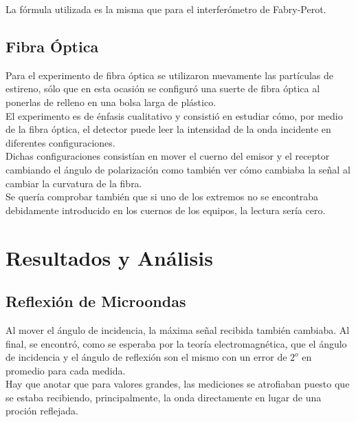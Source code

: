 \documentclass[%
 reprint,
 amsmath,amssymb,
 aps,
]{revtex4-1}
\begin{document}
La fórmula utilizada es la misma que para el interferómetro de Fabry-Perot. \\


\subsection{\label{sec:level2}Fibra Óptica}

Para el experimento de fibra óptica se utilizaron nuevamente las partículas de estireno, sólo que en esta ocasión se configuró una suerte de fibra óptica al ponerlas de relleno en una bolsa larga de plástico. \\

El experimento es de énfasis cualitativo y consistió en estudiar cómo, por medio de la fibra óptica, el detector puede leer la intensidad de la onda incidente en diferentes configuraciones. \\

Dichas configuraciones consistían en mover el cuerno del emisor y el receptor cambiando el ángulo de polarización como también ver cómo cambiaba la señal al cambiar la curvatura de la fibra. \\ 

Se quería comprobar también que si uno de los extremos no se encontraba debidamente introducido en los cuernos de los equipos, la lectura sería cero. \\


\section{\label{sec:level1}Resultados y An\'alisis}

\subsection{\label{sec:level2}Reflexión de Microondas}

Al mover el ángulo de incidencia, la máxima señal recibida también cambiaba. Al final, se encontró, como se esperaba por la teoría electromagnética, que el ángulo de incidencia y el ángulo de reflexión son el mismo con un error de $2^o$ en promedio para cada medida. \\

Hay que anotar que para valores grandes, las mediciones se atrofiaban puesto que se estaba recibiendo, principalmente, la onda directamente en lugar de una proción reflejada. \\
\end{document}

